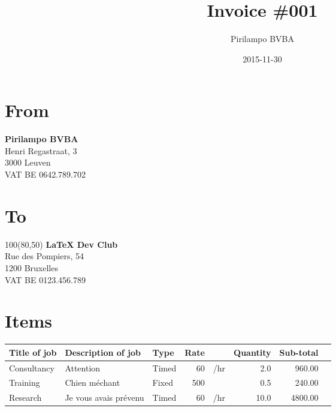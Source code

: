 \documentclass[a4paper,table]{article}
\author{Pirilampo BVBA}
\date{2015-11-30}
\title{Invoice \#001}
\begin{document}
\maketitle
{}

\section*{From}
\label{sec:orgheadline1}

\textbf{Pirilampo BVBA} \\
Henri Regastraat, 3 \\
3000 Leuven \\
VAT BE 0642.789.702

\section*{To}
\label{sec:orgheadline2}

\begin{textblock}{100}(80,50) %
\vspace{4mm}
\noindent %
\textbf{\LaTeX{} Dev Club} \\
Rue des Pompiers, 54 \\
1200 Bruxelles \\
VAT BE 0123.456.789
\vspace{4mm}
\end{textblock}

\section*{Items}
\label{sec:orgheadline3}

\extrarowsep=1mm

\begin{center}
\label{tab:orgtable1}

\begin{tabu}{lXlrlrrl}
Title of job & Description of job & Type & Rate &  & Quantity & Sub-total & \\
\hline
Consultancy & Attention & Timed & 60 & \texteuro{}/hr & 2.0 & 960.00 & \texteuro{}\\
Training & Chien méchant & Fixed & 500 & \texteuro{} & 0.5 & 240.00 & \texteuro{}\\
Research & Je vous avais prévenu & Timed & 60 & \texteuro{}/hr & 10.0 & 4800.00 & \texteuro{}\\
\end{tabu}
\end{center}
\end{document}
